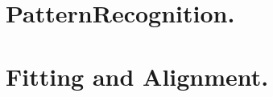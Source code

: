 \documentclass[12pt,a4paper]{report}
\newif\
\newcommand{\twolinesahead}[5][]{
  \def\dist{6};
  \newdimen\ym;
  \newdimen\xm;
  \newdimen\yf;
  \newdimen\xf;
  \ExtractCoordinate{$(#3)$}{\xm}{\ym};
  \ExtractCoordinate{$(#2)$}{\xf}{\yf};
  \ifdim \ym < \yf
  \def\fac{1};
  \else
  \def\fac{-1};
  \fi
  \path [pline] ([yshift=-\dist * \fac]#2.east) -- (#3.west);
  \coordinate (m) at ($(#2)!0.5!(#3)$);
  \coordinate (mp) at ($(m)+(0,1em*\fac)$);
  \node (nm) at (mp) {#5};
  \foreach \x in {\fac,0}
  {
    \ifnum \x = 0
    \path [pline, decoration={markings, mark=at position 0.5 with {\arrow{triangle 60}}}, postaction={decorate}] ([yshift=\dist * \x]#2.east) -- ([yshift=\dist * \x]#4.west);
    \else
    \path [pline] ([yshift=\dist * \x]#2.east) -- ([yshift=\dist * \x]#4.west);
    \fi
  };
}
\begin{document}

\pagestyle{fancy}

    \fancyhf{}%
    \fancyhead[LE,RO]{\thepage}
    \fancyhead[RE]{\textit{\nouppercase{\rightmark}} }
    \fancyhead[LO]{\textit{\nouppercase{\rightmark}} }
    \renewcommand{\headrulewidth}{0pt} %
    \renewcommand{\footrulewidth}{0pt}

\renewcommand{\chaptermark}[1]{ \markright{\thechapter \hspace{0.2cm} #1}{} }
\renewcommand{\sectionmark}[1]{ \markright{\thesection \hspace{0.2cm} #1}{} }
\chapter{PatternRecognition.}
\label{chp:patRec}

\clearpage
\chapter{Fitting and Alignment.}
\label{chp:gbl}

\clearpage
\end{document}

